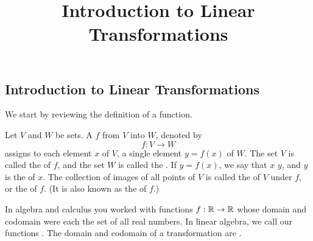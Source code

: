 \documentclass{ximera}
\title{Introduction to Linear Transformations} \license{CC BY-NC-SA 4.0}
\begin{document}
\begin{abstract}
 \end{abstract}
\maketitle

\begin{onlineOnly}
\section*{Introduction to Linear Transformations}
\end{onlineOnly}

We start by reviewing the definition of a function.

\begin{definition} \label{def:function}
  
Let $V$ and $W$ be sets.  A  $f$ from $V$ into $W$, denoted by 
$$f:V\rightarrow W$$
assigns to each element $x$ of $V$, a single element $y=f(x)$ of $W$. 
\vskip 10pt
The set $V$ is called the  of $f$, and the set $W$ is called the .
\vskip 10pt
If $y=f(x)$, we say that $x$  $y$, and $y$ is the  of $x$.
\vskip 10pt
The collection of images of all points of $V$ is called the  of $V$ under $f$, or the  of $f$.  (It is also known as the  of $f$.)  
\end{definition}


In algebra and calculus you worked with functions $f:\mathbb{R}\rightarrow\mathbb{R}$ whose domain and codomain were each the set of all real numbers.  In linear algebra, we call our functions .  The domain and codomain of a transformation are .  %
\end{document}
